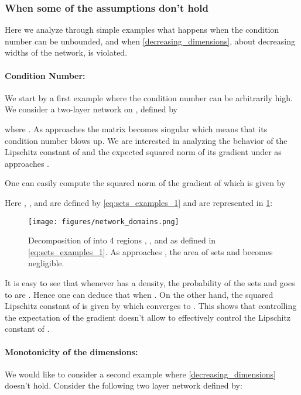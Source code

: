 \documentclass{article}
\begin{document}
\subsubsection{When some of the assumptions don't hold} \label{sec:counterexamples}
Here we analyze through simple examples what happens when the condition number can be unbounded, and when \cref{decreasing_dimensions}, about decreasing widths of the network, is violated.
\paragraph{Condition Number:}\label{example_condition_number}
We start by a first example where the condition number can be arbitrarily high. We consider a two-layer network on , defined by

where . As  approaches  the matrix  becomes singular which means that its condition number blows up. We are interested in analyzing the behavior of the Lipschitz constant of  and the expected squared norm of its gradient under  as  approaches .

One can easily compute the squared norm of the gradient of  which is given by

Here , ,  and  are defined by \cref{eq:sets_examples_1} and are represented in \cref{fig:example_1_domains}:


\begin{figure}[ht]
\centering
        \texttt{[image: figures/network\_domains.png]}
            \caption{Decomposition of  into 4 regions , ,  and  as defined in \cref{eq:sets_examples_1}. As  approaches , the area of sets  and  becomes negligible.}
    \label{fig:example_1_domains}
\end{figure}


It is easy to see that whenever  has a density, the probability of the sets  and  goes to  are . Hence one can deduce that  when . On the other hand, the squared Lipschitz constant of  is given by  which converges to . This shows that controlling the expectation of the gradient doesn't allow to effectively control the Lipschitz constant of .

\paragraph{Monotonicity of the dimensions:}\label{example_monotonicity_dimensions} We would like to consider a second example where \cref{decreasing_dimensions} doesn't hold. Consider the following two layer network defined by:
\end{document}
